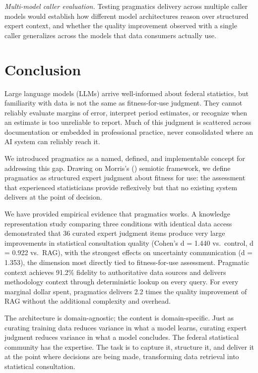 \documentclass[
  11pt,
  letterpaper,
]{article}
\begin{document}
\emph{Multi-model caller evaluation.} Testing pragmatics delivery across
multiple caller models would establish how different model architectures
reason over structured expert context, and whether the quality
improvement observed with a single caller generalizes across the models
that data consumers actually use.

\section{Conclusion}\label{conclusion}

Large language models (LLMs) arrive well-informed about federal
statistics, but familiarity with data is not the same as fitness-for-use
judgment. They cannot reliably evaluate margins of error, interpret
period estimates, or recognize when an estimate is too unreliable to
report. Much of this judgment is scattered across documentation or
embedded in professional practice, never consolidated where an AI system
can reliably reach it.

We introduced pragmatics as a named, defined, and implementable concept
for addressing this gap. Drawing on Morris's
() semiotic framework, we define
pragmatics as structured expert judgment about fitness for use: the
assessment that experienced statisticians provide reflexively but that
no existing system delivers at the point of decision.

We have provided empirical evidence that pragmatics works. A knowledge
representation study comparing three conditions with identical data
access demonstrated that 36 curated expert judgment items produce very
large improvements in statistical consultation quality (Cohen's d =
1.440 vs.~control, d = 0.922 vs.~RAG), with the strongest effects on
uncertainty communication (d = 1.353), the dimension most directly tied
to fitness-for-use assessment. Pragmatic context achieves 91.2\%
fidelity to authoritative data sources and delivers methodology context
through deterministic lookup on every query. For every marginal dollar
spent, pragmatics delivers 2.2 times the quality improvement of RAG
without the additional complexity and overhead.

The architecture is domain-agnostic; the content is domain-specific.
Just as curating training data reduces variance in what a model learns,
curating expert judgment reduces variance in what a model concludes. The
federal statistical community has the expertise. The task is to capture
it, structure it, and deliver it at the point where decisions are being
made, transforming data retrieval into statistical consultation.
\end{document}
